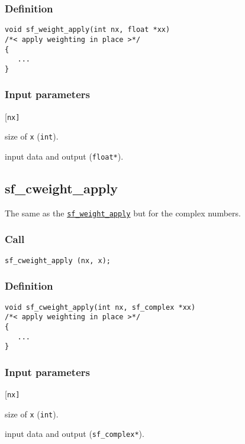\subsubsection*{Definition}
\begin{verbatim}
void sf_weight_apply(int nx, float *xx)
/*< apply weighting in place >*/
{
   ...
}
\end{verbatim}

\subsubsection*{Input parameters}
\begin{desclist}{\tt }{\quad}[\tt nx]
   \setlength\itemsep{0pt}
   \item[nx] size of \texttt{x} (\texttt{int}). 
   \item[x]  input data and output (\texttt{float*}).                   
\end{desclist}




\subsection{{sf\_cweight\_apply}}
The same as the \hyperref[sec:sf_weight_apply]{\texttt{sf\_weight\_apply}} but for the complex numbers.

\subsubsection*{Call}
\begin{verbatim}sf_cweight_apply (nx, x);\end{verbatim}

\subsubsection*{Definition}
\begin{verbatim}
void sf_cweight_apply(int nx, sf_complex *xx)
/*< apply weighting in place >*/
{
   ...
}
\end{verbatim}

\subsubsection*{Input parameters}
\begin{desclist}{\tt }{\quad}[\tt nx]
   \setlength\itemsep{0pt}
   \item[nx] size of \texttt{x} (\texttt{int}). 
   \item[x]  input data and output (\texttt{sf\_complex*}).        
\end{desclist}





